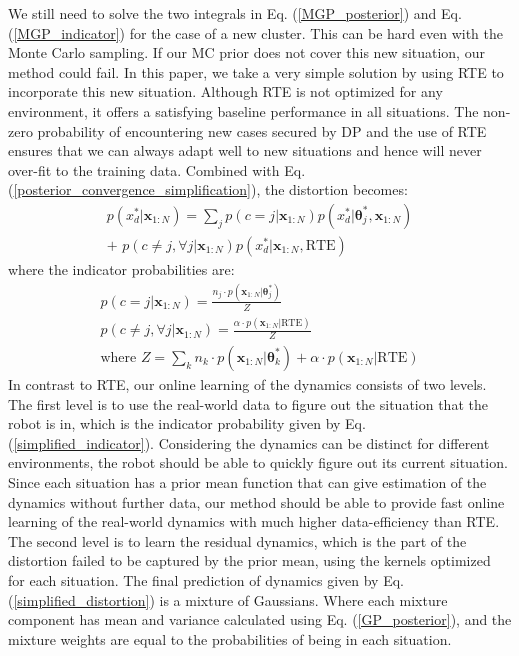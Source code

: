 \documentclass[journal]{IEEEtran}
\begin{document}
We still need to solve the two integrals in Eq. (\ref{MGP_posterior}) and Eq. (\ref{MGP_indicator}) for the case of a new cluster.
This can be hard even with the Monte Carlo sampling. 
If our MC prior does not cover this new situation, our method could fail.
In this paper, we take a very simple solution by using RTE to incorporate this new situation.
Although RTE is not optimized for any environment, it offers a satisfying baseline performance in all situations.
The non-zero probability of encountering new cases secured by DP and the use of RTE ensures that we can always adapt well to new situations and hence will never over-fit to the training data.
Combined with Eq. (\ref{posterior_convergence_simplification}), the distortion becomes:
\begin{equation}
\begin{gathered}
p(x^*_d|\bm{x}_{1:N}) 
= \sum_j p(c=j| \bm{x}_{1:N}) p(x^*_d|\bm{\theta}^*_j, \bm{x}_{1:N})
\\
+ \,\, p(c \neq j, \forall j|\bm{x}_{1:N})  p(x^*_d|\bm{x}_{1:N}, \text{RTE})
\end{gathered}
\label{simplified_distortion}
\end{equation}
where the indicator probabilities are:
\begin{equation}
\begin{gathered}
p(c=j| \bm{x}_{1:N}) 
= \frac{n_j \cdot p(\bm{x}_{1:N}|\bm{\theta}^*_j)
}{Z}
\\ 
p(c \neq j, \forall j| \bm{x}_{1:N})
= \frac{\alpha \cdot p(\bm{x}_{1:N}|\text{RTE})
}{Z}
\\ \text{where }
Z = \sum_k n_k \cdot p(\bm{x}_{1:N}|\bm{\theta}^*_k) + \alpha \cdot p(\bm{x}_{1:N}|\text{RTE})
\end{gathered}
\label{simplified_indicator}
\end{equation}
In contrast to RTE, our online learning of the dynamics consists of two levels.
The first level is to use the real-world data to figure out the situation that the robot is in, which is the indicator probability given by Eq. (\ref{simplified_indicator}).
Considering the dynamics can be distinct for different environments, the robot should be able to quickly figure out its current situation.
Since each situation has a prior mean function that can give estimation of the dynamics without further data, our method should be able to provide fast online learning of the real-world dynamics with much higher data-efficiency than RTE.
The second level is to learn the residual dynamics, which is the part of the distortion failed to be captured by the prior mean, using the kernels optimized for each situation.
The final prediction of dynamics given by Eq. (\ref{simplified_distortion}) is a mixture of Gaussians.
Where each mixture component has mean and variance calculated using Eq. (\ref{GP_posterior}), and the mixture weights are equal to the probabilities of being in each situation.
\end{document}
